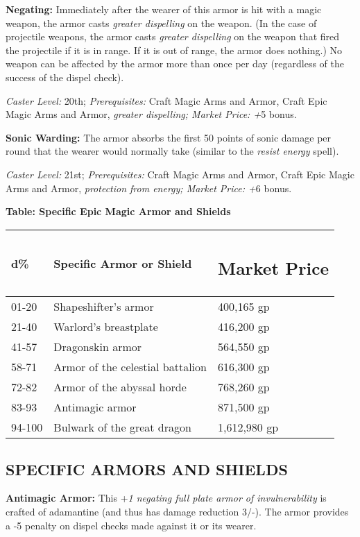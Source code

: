 \documentclass{article}
\begin{document}
\textbf{Negating: }Immediately after the wearer of this armor is hit with a magic 
weapon, the armor casts \textit{greater dispelling }on the weapon. (In the case 
of projectile weapons, the armor casts \textit{greater dispelling }on the weapon 
that fired the projectile if it is in range. If it is out of range, the armor does 
nothing.) No weapon can be affected by the armor more than once per day (regardless 
of the success of the dispel check). 

\textit{Caster Level: }20th; \textit{Prerequisites: }Craft Magic Arms and Armor, 
Craft Epic Magic Arms and Armor, \textit{greater dispelling; Market Price: +}5 
bonus. 

\textbf{Sonic Warding: }The armor absorbs the first 50 points of sonic damage per 
round that the wearer would normally take (similar to the \textit{resist energy 
}spell). 

\textit{Caster Level: }21st; \textit{Prerequisites: }Craft Magic Arms and Armor, 
Craft Epic Magic Arms and Armor, \textit{protection from energy; Market Price: 
+}6 bonus. 

\vspace{12pt}
\textbf{Table: Specific Epic Magic Armor and Shields }

\begin{tabular}{|>{\raggedright}p{36pt}|>{\raggedright}p{176pt}|>{\raggedright}p{63pt}|}
\hline
d\textbf{\%} & S\textbf{pecific Armor or Shield} & \subsection*{M\textbf{arket 
Price }}\tabularnewline
\hline
01-20 & Shapeshifter's armor & 400,165 gp \tabularnewline
\hline
21-40 & Warlord's breastplate & 416,200 gp \tabularnewline
\hline
41-57 & Dragonskin armor & 564,550 gp \tabularnewline
\hline
58-71 & Armor of the celestial battalion & 616,300 gp \tabularnewline
\hline
72-82 & Armor of the abyssal horde & 768,260 gp \tabularnewline
\hline
83-93 & Antimagic armor & 871,500 gp \tabularnewline
\hline
94-100 & Bulwark of the great dragon & 1,612,980 gp\tabularnewline
\hline
\end{tabular}

\vspace{12pt}
\subsection*{SPECIFIC ARMORS AND SHIELDS }

\vspace{12pt}
\textbf{Antimagic Armor: }This +\textit{1 negating full plate armor of invulnerability 
}is crafted of adamantine (and thus has damage reduction 3/-). The armor provides 
a -5 penalty on dispel checks made against it or its wearer. 
\end{document}
